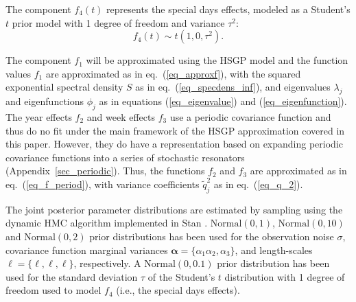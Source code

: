 The component $f_4(t)$ represents the special days effects, modeled as a Student's $t$ prior model with 1 degree of freedom and variance $\tau^2$:
%
\begin{equation*}
f_4(t) \sim t(1,0,\tau^2).
\end{equation*}
%

The component $f_1$ will be approximated using the HSGP model and the function values $f_1$ are approximated as in eq.~(\ref{eq_approxf}), with the squared exponential spectral density $S$ as in eq.~(\ref{eq_specdens_inf}), and eigenvalues $\lambda_j$ and eigenfunctions $\phi_j$ as in equations (\ref{eq_eigenvalue}) and (\ref{eq_eigenfunction}). The year effects $f_2$ and week effects $f_3$ use a periodic covariance function  and thus do no fit under the main framework of the HSGP approximation covered in this paper. However, they do have a representation based on expanding periodic covariance functions into a series of stochastic resonators (Appendix~\ref{sec_periodic}). Thus, the functions $f_2$ and $f_3$ are approximated as in eq.~(\ref{eq_f_period}), with variance coefficients $\tilde{q}_j^2$ as in eq.~(\ref{eq_q_2}).

The joint posterior parameter distributions are estimated by sampling using the dynamic HMC algorithm implemented in Stan \citep{StanTeam:2021}. $\mathrm{Normal}(0,1)$, $\mathrm{Normal}(0,10)$ and $\mathrm{Normal}(0,2)$ prior distributions has been used for the observation noise $\sigma$, covariance function marginal variances $\bm{\alpha}=\{\alpha_1 \alpha_2, \alpha_3\}$, and length-scales $\bm{\ell}=\{\ell, \ell,\ell\}$, respectively. A $\mathrm{Normal}(0,0.1)$ prior distribution has been used for the standard deviation $\tau$ of the Student's $t$ distribution with 1 degree of freedom used to model $f_4$ (i.e., the special days effects).

